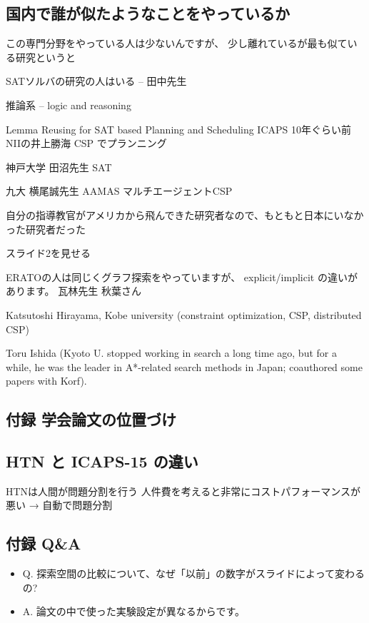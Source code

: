 \subsection{国内で誰が似たようなことをやっているか}
\label{sec-5-16}

この専門分野をやっている人は少ないんですが、
少し離れているが最も似ている研究というと

SATソルバの研究の人はいる -- 田中先生

推論系 -- logic and reasoning

Lemma Reusing for SAT based Planning and Scheduling
ICAPS 10年ぐらい前 NIIの井上勝海 CSP でプランニング

神戸大学
田沼先生 SAT

九大 横尾誠先生
AAMAS マルチエージェントCSP

自分の指導教官がアメリカから飛んできた研究者なので、もともと日本にいなかった研究者だった

スライド2を見せる

ERATOの人は同じくグラフ探索をやっていますが、
explicit/implicit の違いがあります。
瓦林先生
秋葉さん

Katsutoshi Hirayama, Kobe university  (constraint optimization, CSP, distributed CSP)

Toru Ishida (Kyoto U. stopped working in search a long time ago, but for a while, he was the leader in A*-related search methods in Japan; coauthored some papers with Korf).

\subsection{付録 学会論文の位置づけ}
\label{sec-5-17}

\subsection{HTN と ICAPS-15 の違い}
\label{sec-5-18}

HTNは人間が問題分割を行う
人件費を考えると非常にコストパフォーマンスが悪い
→ 自動で問題分割

\subsection{付録 Q\&A}
\label{sec-5-19}

\begin{itemize}
\item Q. 探索空間の比較について、なぜ「以前」の数字がスライドによって変わるの?
\item A. 論文の中で使った実験設定が異なるからです。
\end{itemize}

